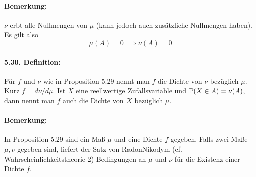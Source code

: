  \paragraph{Bemerkung:}$\nu$ erbt alle Nullmengen von $\mu$ (kann jedoch auch zus\"atzliche Nullmengen haben). Es gilt also 
 $$\mu(A)=0\implies\nu(A)=0$$
 
 \paragraph{5.30. Definition:}F\"ur $f$ und $\nu$ wie in Proposition 5.29 nennt man $f$ die Dichte von $\nu$ bez\"uglich $\mu$. Kurz $f={d\nu}/{d\mu}$. Ist $X$ eine reellwertige Zufallsvariable und $\mathbb{P}(X\in A)=\nu(A)$, dann nennt man $f$ auch die Dichte von $X$ bez\"uglich $\mu$. 
 
 \paragraph{Bemerkung:}In Proposition 5.29 sind ein Ma\ss{} $\mu$ und eine Dichte $f$ gegeben. Falls zwei Ma\ss{}e $\mu,\nu$ gegeben sind, liefert der Satz von Radon\textendash Nikodym (cf. Wahrscheinlichkeitstheorie 2) Bedingungen an $\mu$ und $\nu$ f\"ur die Existenz einer Dichte $f$.
 